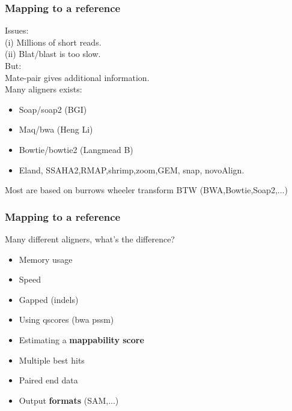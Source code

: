 
\begin{frame}
\frametitle{Mapping to a reference}

	Issues:\\
	(i) Millions of short reads.\\
	(ii) Blat/blast is too slow.\\
	But:\\
	Mate-pair gives additional information.\\

	Many aligners exists:
	\begin{itemize}
		\item Soap/soap2 (BGI)
		\item Maq/bwa (Heng Li)
		\item Bowtie/bowtie2 (Langmead B)
		\item Eland, SSAHA2,RMAP,shrimp,zoom,GEM, snap, novoAlign.
	\end{itemize}
	Most are based on burrows wheeler transform BTW (BWA,Bowtie,Soap2,...)

\end{frame}


\begin{frame}
\frametitle{Mapping to a reference}

	Many different aligners, what's the difference?

	\begin{itemize}
		\item Memory usage
		\item Speed
		\item Gapped (indels)
		\item Using qscores (bwa pssm)
		\item Estimating a \textbf{mappability score}
		\item Multiple best hits
		\item Paired end data
		\item Output \textbf{formats} (SAM,...)
	\end{itemize}

\end{frame}



